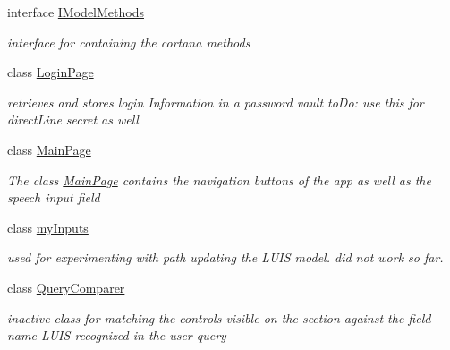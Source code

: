 \begin{DoxyCompactItemize}
interface \hyperlink{interface_listen_to_me_1_1_i_model_methods}{I\+Model\+Methods}
\begin{DoxyCompactList}\small\item\em interface for containing the cortana methods \end{DoxyCompactList}\item 
class \hyperlink{class_listen_to_me_1_1_login_page}{Login\+Page}
\begin{DoxyCompactList}\small\item\em retrieves and stores login Information in a password vault to\+Do\+: use this for direct\+Line secret as well \end{DoxyCompactList}\item 
class \hyperlink{class_listen_to_me_1_1_main_page}{Main\+Page}
\begin{DoxyCompactList}\small\item\em The class \hyperlink{class_listen_to_me_1_1_main_page}{Main\+Page} contains the navigation buttons of the app as well as the speech input field \end{DoxyCompactList}\item 
class \hyperlink{class_listen_to_me_1_1my_inputs}{my\+Inputs}
\begin{DoxyCompactList}\small\item\em used for experimenting with path updating the L\+U\+IS model. did not work so far. \end{DoxyCompactList}\item 
class \hyperlink{class_listen_to_me_1_1_query_comparer}{Query\+Comparer}
\begin{DoxyCompactList}\small\item\em inactive class for matching the controls visible on the section against the field name L\+U\+IS recognized in the user query \end{DoxyCompactList}\end{DoxyCompactItemize}

